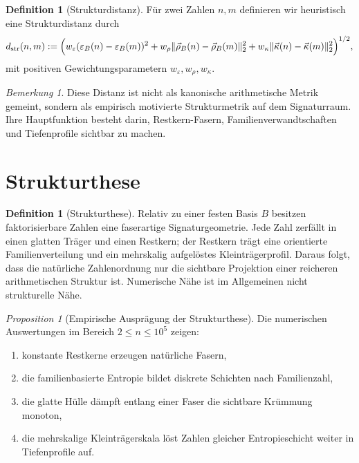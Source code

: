 \documentclass[11pt,a4paper]{article}
\theoremstyle{definition}
\newtheorem{definition}[satz]{Definition}
\theoremstyle{remark}
\newtheorem{bemerkung}[satz]{Bemerkung}
\newtheorem{proposition}[satz]{Proposition}
\begin{document}
\begin{definition}[Strukturdistanz]
Für zwei Zahlen $n,m$ definieren wir heuristisch eine Strukturdistanz durch
\[
 d_{\mathrm{str}}(n,m):=
 \Bigl(
 w_\varepsilon(\varepsilon_B(n)-\varepsilon_B(m))^2
 +w_\rho\lVert\vec\rho_B(n)-\vec\rho_B(m)\rVert_2^2
 +w_\kappa\lVert\vec\kappa(n)-\vec\kappa(m)\rVert_2^2
 \Bigr)^{1/2},
\]
mit positiven Gewichtungsparametern $w_\varepsilon,w_\rho,w_\kappa$.
\end{definition}

\begin{bemerkung}
Diese Distanz ist nicht als kanonische arithmetische Metrik gemeint, sondern als empirisch motivierte Strukturmetrik auf dem Signaturraum. Ihre Hauptfunktion besteht darin, Restkern-Fasern, Familienverwandtschaften und Tiefenprofile sichtbar zu machen.
\end{bemerkung}

\section{Strukturthese}

\begin{definition}[Strukturthese]
Relativ zu einer festen Basis $B$ besitzen faktorisierbare Zahlen eine faserartige Signaturgeometrie. Jede Zahl zerfällt in einen glatten Träger und einen Restkern; der Restkern trägt eine orientierte Familienverteilung und ein mehrskalig aufgelöstes Kleinträgerprofil. Daraus folgt, dass die natürliche Zahlenordnung nur die sichtbare Projektion einer reicheren arithmetischen Struktur ist. Numerische Nähe ist im Allgemeinen nicht strukturelle Nähe.
\end{definition}

\begin{proposition}[Empirische Ausprägung der Strukturthese]
Die numerischen Auswertungen im Bereich $2\le n\le 10^5$ zeigen:
\begin{enumerate}[label=(\roman*)]
\item konstante Restkerne erzeugen natürliche Fasern,
\item die familienbasierte Entropie bildet diskrete Schichten nach Familienzahl,
\item die glatte Hülle dämpft entlang einer Faser die sichtbare Krümmung monoton,
\item die mehrskalige Kleinträgerskala löst Zahlen gleicher Entropieschicht weiter in Tiefenprofile auf.
\end{enumerate}
\end{proposition}
\end{document}

